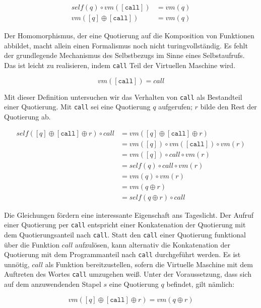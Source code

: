\begin{align}
self(q)\circ vm([\mathtt{call}]) &= vm(q) \\
    vm([q]\oplus[\mathtt{call}]) &= vm(q) 
\end{align}


Der Homomorphismus, der eine Quotierung auf die Komposition von Funktionen abbildet, macht allein einen Formalismus noch nicht turingvollständig. Es fehlt der grundlegende Mechanismus des Selbstbezugs im Sinne eines Selbstaufrufs. Das ist leicht zu realisieren, indem \verb|call| Teil der Virtuellen Maschine wird.

\begin{equation}
vm([\mathtt{call}])=call %
\end{equation}

Mit dieser Definition untersuchen wir das Verhalten von \verb|call| als Bestandteil einer Quotierung. Mit \verb|call| sei eine Quotierung $q$ aufgerufen; $r$ bilde den Rest der Quotierung ab.

\begin{align}
self([q]\oplus [\mathtt{call}]\oplus r)\circ call
&= vm([q]\oplus    [\mathtt{call}]  \oplus r)    \\
&= vm([q])\circ vm([\mathtt{call}]) \circ vm(r)  \\
&=  vm([q])\circ call                \circ vm(r) \\
&= self(q) \circ call                \circ vm(r) \\
&=   vm(q)                           \circ vm(r) \\
&=   vm(q         \oplus                      r) \\
&= self(q\oplus r) \circ call
\end{align}

Die Gleichungen fördern eine interessante Eigenschaft ans Tageslicht. Der Aufruf einer Quotierung per \verb|call| entspricht einer Konkatenation der Quotierung mit dem Quotierungsanteil nach \verb|call|. Statt den \verb|call| einer Quotierung funktional über die Funktion $call$ aufzulösen, kann alternativ die Konkatenation der Quotierung mit dem Programmanteil nach \verb|call| durchgeführt werden. Es ist unnötig, $call$ als Funktion bereitzustellen, sofern die Virtuelle Maschine mit dem Auftreten des Wortes \verb|call| umzugehen weiß. Unter der Voraussetzung, dass sich auf dem anzuwendenden Stapel $s$ eine Quotierung $q$ befindet, gilt nämlich:

\begin{equation}
vm([q]\oplus[\mathtt{call}]\oplus r) =
vm(q \oplus r)
\end{equation}

